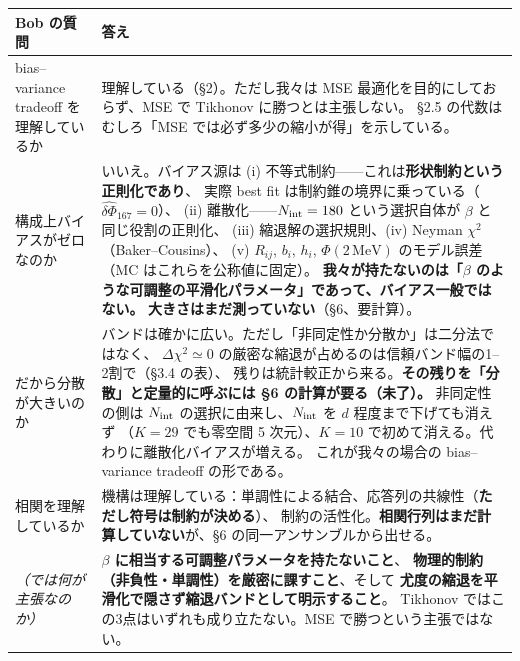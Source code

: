 \documentclass[11pt,a4paper]{ltjsarticle}
\newcommand{\dPh}{\widehat{\delta\Phi}}
\newcommand{\Nint}{N_{\rm int}}
\begin{document}
\begin{center}
\begin{tabular}{p{}p{}}
\toprule
\textbf{Bob の質問} & \textbf{答え} \\
\midrule
bias--variance tradeoff を理解しているか &
理解している（\S2）。ただし我々は MSE 最適化を目的にしておらず、MSE で Tikhonov に勝つとは主張しない。
\S2.5 の代数はむしろ「MSE では必ず多少の縮小が得」を示している。 \\[3pt]
構成上バイアスがゼロなのか &
いいえ。バイアス源は (i) 不等式制約——これは\textbf{形状制約という正則化であり}、
実際 best fit は制約錐の境界に乗っている（$\dPh_{167}=0$）、
(ii) 離散化——$\Nint=180$ という選択自体が $\beta$ と同じ役割の正則化、
(iii) 縮退解の選択規則、(iv) Neyman $\chi^2$（Baker--Cousins）、
(v) $R_{ij}$, $b_i$, $h_i$, $\Phi(2\,\mathrm{MeV})$ のモデル誤差（MC はこれらを公称値に固定）。
\textbf{我々が持たないのは「$\beta$ のような可調整の平滑化パラメータ」であって、バイアス一般ではない。}
\textbf{大きさはまだ測っていない}（\S6、要計算）。 \\[3pt]
だから分散が大きいのか &
バンドは確かに広い。ただし「非同定性か分散か」は二分法ではなく、
$\Delta\chi^2\simeq0$ の厳密な縮退が占めるのは信頼バンド幅の1--2割で（\S3.4 の表）、
残りは統計較正から来る。\textbf{その残りを「分散」と定量的に呼ぶには \S6 の計算が要る（未了）。}
非同定性の側は $\Nint$ の選択に由来し、$\Nint$ を $d$ 程度まで下げても消えず
（$K=29$ でも零空間 5 次元）、$K=10$ で初めて消える。代わりに離散化バイアスが増える。
これが我々の場合の bias--variance tradeoff の形である。 \\[3pt]
相関を理解しているか &
機構は理解している：単調性による結合、応答列の共線性（\textbf{ただし符号は制約が決める}）、
制約の活性化。\textbf{相関行列はまだ計算していない}が、\S6 の同一アンサンブルから出せる。 \\[3pt]
\textit{（では何が主張なのか）} &
\textbf{$\beta$ に相当する可調整パラメータを持たないこと}、
\textbf{物理的制約（非負性・単調性）を厳密に課すこと}、そして
\textbf{尤度の縮退を平滑化で隠さず縮退バンドとして明示すること}。
Tikhonov ではこの3点はいずれも成り立たない。MSE で勝つという主張ではない。 \\
\bottomrule
\end{tabular}
\end{center}
\end{document}
